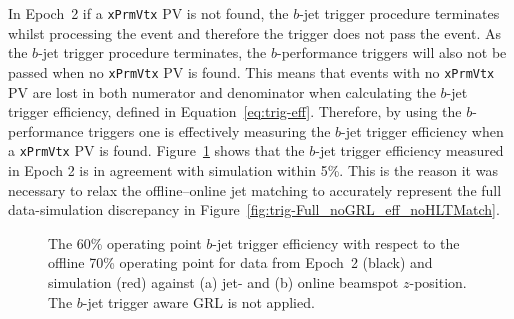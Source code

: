 In Epoch~2 if a \verb|xPrmVtx| PV is not found, the $b$-jet trigger procedure terminates whilst processing the event and therefore the trigger does not pass the event.
As the $b$-jet trigger procedure terminates, the $b$-performance triggers will also not be passed when no \verb|xPrmVtx| PV is found.
This means that events with no \verb|xPrmVtx| PV are lost in both numerator and denominator when calculating the $b$-jet trigger efficiency, defined in Equation~\ref{eq:trig-eff}.
Therefore, by using the $b$-performance triggers one is effectively measuring the  $b$-jet trigger efficiency when a \verb|xPrmVtx| PV is found.
Figure~\ref{fig:Epoch2_eff} shows that the $b$-jet trigger efficiency measured in Epoch 2 is in agreement with simulation within 5\%.
This is the reason it was necessary to relax the offline--online jet matching to accurately represent the full data-simulation discrepancy in Figure~\ref{fig:trig-Full_noGRL_eff_noHLTMatch}.

\begin{figure}[!htb]
\begin{center}
  \captionsetup[subfigure]{aboveskip=0pt,justification=centering}
\end{center}
\vspace{-1em}
\caption[
  The $b$-jet trigger efficiency 
  for data from Epoch~2 and simulation against jet-\pT{} and online beamspot $z$-position.
  The $b$-jet trigger aware GRL is not applied.]
        {
  The 60\% operating point $b$-jet trigger efficiency with respect to the offline 70\% operating point
  for data from Epoch~2 (black) and simulation (red) against (a) jet-\pT{} and (b) online beamspot $z$-position.
  The $b$-jet trigger aware GRL is not applied.}
\label{fig:Epoch2_eff}
\end{figure}


